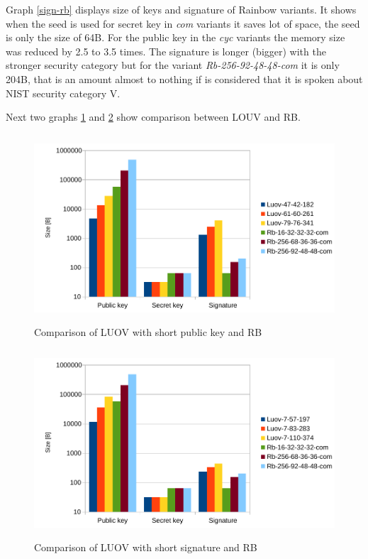 \documentclass[thesis=M,english]{FITthesis}[2019/12/23]
\begin{document}
\noindent
Graph \ref{sign-rb} displays size of keys and signature of Rainbow variants. It shows when the seed is used for secret key in \textit{com} variants it saves lot of space, the seed is only the size of 64B. For the public key in the \textit{cyc} variants the memory size was reduced by 2.5 to 3.5 times. The signature is longer (bigger) with the stronger security category but for the variant \textit{Rb-256-92-48-48-com} it is only 204B, that is an amount almost to nothing if is considered that it is spoken about NIST security category V.

\bigskip
\noindent
Next two graphs \ref{sign-all1} and \ref{sign-all2} show comparison between LOUV and RB.

\begin{figure}[H]
\centering
\includegraphics[width=13cm,height=7cm]{images/mem-sign-all1.pdf}
\caption{Comparison of LUOV with short public key and RB}
\label{sign-all1}
\end{figure}

\begin{figure}[H]
\centering
\includegraphics[width=13cm,height=7cm]{images/mem-sign-all2.pdf}
\caption{Comparison of LUOV with short signature and RB}
\label{sign-all2}
\end{figure}
\end{document}
